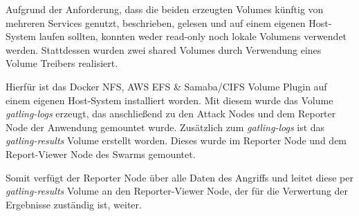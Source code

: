 Aufgrund der Anforderung, dass die beiden erzeugten Volumes künftig von mehreren Services genutzt, beschrieben, gelesen und auf einem eigenen Host-System laufen sollten, konnten weder read-only noch lokale Volumens verwendet werden. 
Stattdessen wurden zwei shared Volumes durch Verwendung eines Volume Treibers realisiert.

Hierfür ist das Docker NFS, AWS EFS \& Samaba/CIFS Volume Plugin auf einem eigenen Host-System installiert worden.
Mit diesem wurde das Volume \textit{gatling-logs} erzeugt, das anschließend zu den Attack Nodes und dem Reporter Node der Anwendung gemountet wurde. 
Zusätzlich zum \textit{gatling-logs} ist das \textit{gatling-results} Volume erstellt worden. 
Dieses wurde im Reporter Node und dem Report-Viewer Node des Swarms gemountet.

Somit verfügt der Reporter Node über alle Daten des Angriffs und leitet diese per \textit{gatling-results} Volume an den Reporter-Viewer Node, der für die Verwertung der Ergebnisse zuständig ist, weiter.
